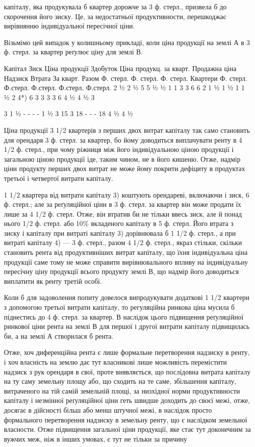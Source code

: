 \parcont{}  %
капіталу, яка продукувала б квартер дорожче за 3 ф. стерл., призвела б до
скорочення його зиску. Це, за недостатньої продуктивности, перешкоджає вирівнянню індивідуальної
пересічної ціни.

Візьмімо цей випадок у колишньому прикладі, коли ціна продукції на
землі А в 3 ф. стерл. за квартер реґулює ціну для землі В.

Капітал Зиск Ціна продукції  Здобуток Ціна продукц. за кварт. Продажна ціна Надзиск Втрата
     За кварт. Разом
Ф. стерл. Ф. стерл. Ф. стерл.
 Квартери Ф. стерл. Ф.стерл. Ф.стерл. Ф.стерл. Ф.стерл.
2 ½
2 ½
5
5 ½
½
1
1 3
3
6
6 2
1 ½
1 ½
1 1 ½
2
4*)
6 3
3
3
3 6
4 ½
4 ½
3

 3
1 ½
-
- -
-
1 ½
3
15 3 18 - - - 18 4 ½
 4 ½

Ціна продукції 3 1/2 квартерів з перших двох витрат капіталу так само
становить для орендаря 3 ф. стерл. за квартер, бо йому доводиться виплачувати
ренту в 4  1/2 ф. стерл., при чому ріжниця між його індивідуальною ціною продукції
і загальною ціною продукції іде, таким чином, не в його кишеню. Отже,
надмір ціни продукту перших двох витрат не може йому покрити дефіциту
в продуктах третьої і четвертої витрати капіталу.

1 1/2 квартера від витрати капіталу 3) коштують орендареві, включаючи
і зиск, 6 ф. стерл.; але за реґуляційної ціни в 3 ф. стерл. за квартер він може
продати їх лише за 4  1/2 ф. стерл. Отже, він втратив би не тільки ввесь
зиск, але й понад нього 1/2  ф. стерл. або  10\% вкладеного капіталу в 5 ф. стерл.
Його втрата з зиску і капіталу при витраті капіталу 3) дорівнювала б  1  1/2
ф. стерл., а при витраті капіталу 4) — 3 ф. стерл., разом 4  1/2 ф. стерл., якраз
стільки, скільки становить рента від продуктивніших витрат капіталу, що їхня
індивідуальна ціна продукції саме тому не може справити вирівнювального
впливу на індивідуальну пересічну ціну продукції всього продукту землі В, що
надмір його доводиться виплатити як ренту третій особі.

Коли б для задоволення попиту довелося випродукувати додаткові 1  1/2
квартери з допомогою третьої витрати капіталу, то регуляційна ринкова ціна
мусила б піднестись до 4 ф. стерл. за квартер. В наслідок цього підвищення
реґуляційної ринкової ціни рента на землі В для першої і другої витрати капіталу
підвищилась би, а на землі А створилася б рента.

Отже, хоч диференційна рента є лише формальне перетворення надзиску
в ренту, і хоч власність на землю дає тут власникові лише можливість перемістити
надзиск з рук орендаря в свої, проте виявляється, що послідовна витрата
капіталу на ту саму земельну площу або, що сходить на те саме, збільшення
капіталу, витраченого на тій самій земельній площі, за низхідної норми
продуктивности капіталу і незмінної реґуляційної ціни геть швидше доходить
до своєї межі, отже, досягає в дійсності більш або менш штучної межі, в наслідок
просто формального перетворення надзиску в земельну ренту, що є наслідком
земельної власности. Отже підвищення загальної ціни продукції, яке стає
тут доконечним за вужчих меж, ніж в інших умовах, є тут не тільки за причину
\parbreak{}  %
